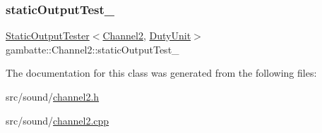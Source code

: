 \mbox{\label{classgambatte_1_1Channel2_ade1b5b7d5517320d0a92a5ae0b1af918}} 
\subsubsection{\texorpdfstring{static\+Output\+Test\+\_\+}{staticOutputTest\_}}
{\footnotesize\ttfamily \hyperlink{classgambatte_1_1StaticOutputTester}{Static\+Output\+Tester}$<$\hyperlink{classgambatte_1_1Channel2}{Channel2}, \hyperlink{classgambatte_1_1DutyUnit}{Duty\+Unit}$>$ gambatte\+::\+Channel2\+::static\+Output\+Test\+\_\+\hspace{0.3cm}{\ttfamily [private]}}



The documentation for this class was generated from the following files\+:\begin{DoxyCompactItemize}
\item 
src/sound/\hyperlink{channel2_8h}{channel2.\+h}\item 
src/sound/\hyperlink{channel2_8cpp}{channel2.\+cpp}\end{DoxyCompactItemize}
